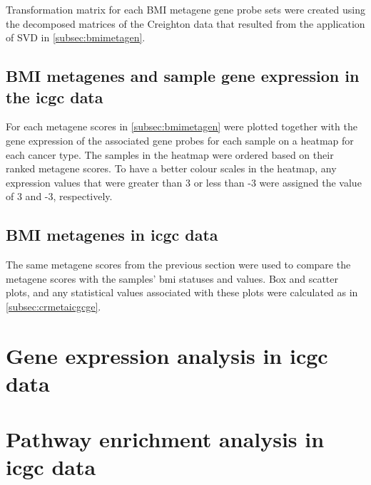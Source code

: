 Transformation matrix for each BMI metagene gene probe sets were created using the decomposed matrices of the Creighton data that resulted from the application of SVD in \ref{subsec:bmimetagen}.

\subsection{BMI metagenes and sample gene expression in the \gls{icgc} data}
\label{subsec:gpconv}

For each \gls{metagene} scores in \cref{subsec:bmimetagen} were plotted together with the gene expression of the associated gene probes for each sample on a heatmap for each cancer type.
The samples in the heatmap were ordered based on their ranked \gls{metagene} scores.
To have a better colour scales in the heatmap, any expression values that were greater than 3 or less than -3 were assigned the value of 3 and -3, respectively.

\subsection{BMI metagenes in \gls{icgc} data}
\label{subsec:bmidegmetaicgc}

The same \gls{metagene} scores from the previous section were used to compare the \gls{metagene} scores with the samples' \gls{bmi} statuses and values.
Box and scatter plots, and any statistical values associated with these plots were calculated as in \cref{subsec:crmetaicgcge}.



\newpage





\section{Gene expression analysis in \gls{icgc} data}
\label{sec:degicgc}

\section{Pathway enrichment analysis in \gls{icgc} data}
\label{sec:pathenrich}







